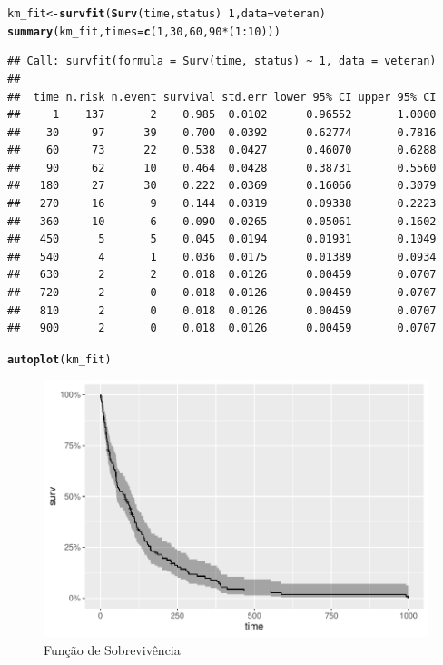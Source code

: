 \documentclass[a4paper, oneside]{book}\usepackage[]{graphicx}\usepackage[]{color}
\makeatletter
\def\maxwidth{ %
  \ifdim\Gin@nat@width>\linewidth
    \linewidth
  \else
    \Gin@nat@width
  \fi
}
\newcommand{\hlnum}[1]{\textcolor[rgb]{0.686,0.059,0.569}{#1}}%
\newcommand{\hlopt}[1]{\textcolor[rgb]{0,0,0}{#1}}%
\newcommand{\hlstd}[1]{\textcolor[rgb]{0.345,0.345,0.345}{#1}}%
\newcommand{\hlkwb}[1]{\textcolor[rgb]{0.69,0.353,0.396}{#1}}%
\newcommand{\hlkwc}[1]{\textcolor[rgb]{0.333,0.667,0.333}{#1}}%
\newcommand{\hlkwd}[1]{\textcolor[rgb]{0.737,0.353,0.396}{\textbf{#1}}}%
\newenvironment{kframe}{%
 \def\at@end@of@kframe{}%
 \ifinner\ifhmode%
  \def\at@end@of@kframe{\end{minipage}}%
  \begin{minipage}{\columnwidth}%
 \fi\fi%
 \def\FrameCommand##1{\hskip\@totalleftmargin \hskip-\fboxsep
 \colorbox{shadecolor}{##1}\hskip-\fboxsep
     \hskip-\linewidth \hskip-\@totalleftmargin \hskip\columnwidth}%
 \MakeFramed {\advance\hsize-\width
   \@totalleftmargin\z@ \linewidth\hsize
   \@setminipage}}%
 {\par\unskip\endMakeFramed%
 \at@end@of@kframe}
\newenvironment{knitrout}{}{} %
\makeatother
\begin{document}
\begin{knitrout}
\color{fgcolor}\begin{kframe}
\begin{alltt}
\hlstd{km_fit} \hlkwb{<-} \hlkwd{survfit}\hlstd{(}\hlkwd{Surv}\hlstd{(time, status)} \hlopt{~} \hlnum{1}\hlstd{,} \hlkwc{data}\hlstd{=veteran)}
\hlkwd{summary}\hlstd{(km_fit,} \hlkwc{times} \hlstd{=} \hlkwd{c}\hlstd{(}\hlnum{1}\hlstd{,}\hlnum{30}\hlstd{,}\hlnum{60}\hlstd{,}\hlnum{90}\hlopt{*}\hlstd{(}\hlnum{1}\hlopt{:}\hlnum{10}\hlstd{)))}
\end{alltt}
\begin{verbatim}
## Call: survfit(formula = Surv(time, status) ~ 1, data = veteran)
## 
##  time n.risk n.event survival std.err lower 95% CI upper 95% CI
##     1    137       2    0.985  0.0102      0.96552       1.0000
##    30     97      39    0.700  0.0392      0.62774       0.7816
##    60     73      22    0.538  0.0427      0.46070       0.6288
##    90     62      10    0.464  0.0428      0.38731       0.5560
##   180     27      30    0.222  0.0369      0.16066       0.3079
##   270     16       9    0.144  0.0319      0.09338       0.2223
##   360     10       6    0.090  0.0265      0.05061       0.1602
##   450      5       5    0.045  0.0194      0.01931       0.1049
##   540      4       1    0.036  0.0175      0.01389       0.0934
##   630      2       2    0.018  0.0126      0.00459       0.0707
##   720      2       0    0.018  0.0126      0.00459       0.0707
##   810      2       0    0.018  0.0126      0.00459       0.0707
##   900      2       0    0.018  0.0126      0.00459       0.0707
\end{verbatim}
\begin{alltt}
\hlkwd{autoplot}\hlstd{(km_fit)}
\end{alltt}
\end{kframe}\begin{figure}

{\centering \includegraphics[width=\maxwidth]{figure/script3-1} 

}

\caption[Função de Sobrevivência]{Função de Sobrevivência}\label{fig:script3}
\end{figure}


\end{knitrout}
\end{document}
